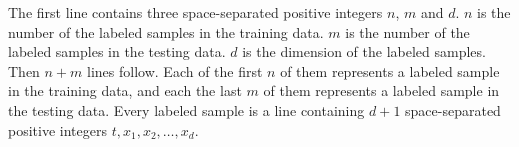 The first line contains three space-separated positive integers 
$n$, $m$ and $d$.
$n$ is the number of the labeled samples in the training data. 
$m$ is the number of the labeled samples in the testing data.
$d$ is the dimension of the labeled samples.
Then $n+m$ lines follow. 
Each of the first $n$ of them represents a labeled sample in 
the training data, and each the last $m$ of them represents a 
labeled sample in the testing data.
Every labeled sample is a line containing $d+1$ space-separated positive
integers $t,x_1,x_2,\dots,x_d$. 
